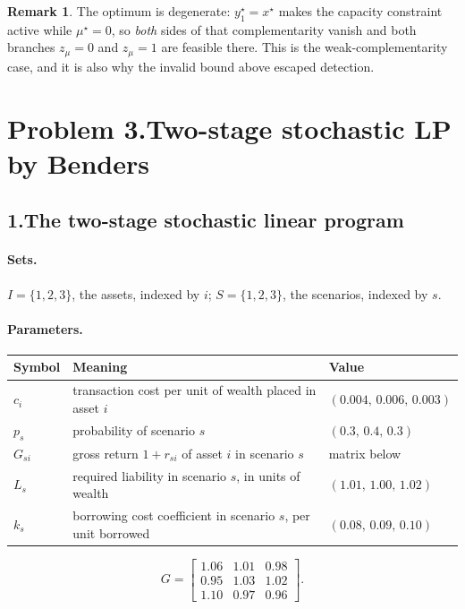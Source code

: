 \documentclass[11pt]{article}
\theoremstyle{definition}
\newtheorem{remark}{Remark}
\begin{document}
\begin{remark}
The optimum is degenerate: $y_1^\star = x^\star$ makes the capacity
constraint active while $\mu^\star = 0$, so \emph{both} sides of that
complementarity vanish and both branches $z_\mu = 0$ and $z_\mu = 1$
are feasible there. This is the weak-complementarity case, and it is
also why the invalid bound above escaped detection.
\end{remark}

\section*{Problem 3.\quad Two-stage stochastic LP by Benders \quad[20 pts]}

\subsection*{1.\quad The two-stage stochastic linear program}

\paragraph{Sets.} $I = \{1,2,3\}$, the assets, indexed by $i$;
$S = \{1,2,3\}$, the scenarios, indexed by $s$.

\paragraph{Parameters.}
\begin{center}
\begin{tabular}{@{}lll@{}}
\toprule
Symbol & Meaning & Value\\
\midrule
$c_i$ & transaction cost per unit of wealth placed in asset $i$
  & $(0.004,\,0.006,\,0.003)$\\
$p_s$ & probability of scenario $s$ & $(0.3,\,0.4,\,0.3)$\\
$G_{si}$ & gross return $1+r_{si}$ of asset $i$ in scenario $s$
  & matrix below\\
$L_s$ & required liability in scenario $s$, in units of wealth
  & $(1.01,\,1.00,\,1.02)$\\
$k_s$ & borrowing cost coefficient in scenario $s$, per unit borrowed
  & $(0.08,\,0.09,\,0.10)$\\
\bottomrule
\end{tabular}
\end{center}
\[
  G = \begin{bmatrix}
    1.06 & 1.01 & 0.98\\
    0.95 & 1.03 & 1.02\\
    1.10 & 0.97 & 0.96
  \end{bmatrix}.
\]
\end{document}
